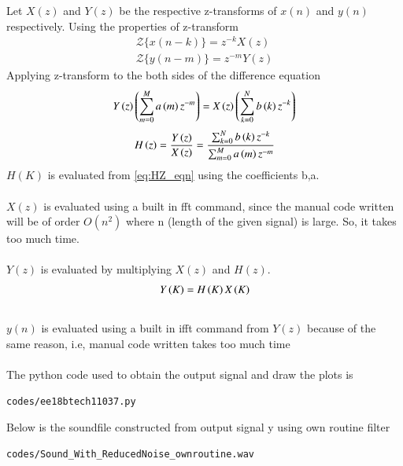 \documentclass[journal,12pt,twocolumn]{IEEEtran}
\begin{document}
  Let $X(z)$ and $Y(z)$ be the respective z-transforms of $x(n)$ and $y(n)$ respectively.
  Using the properties of z-transform
  \begin{align}
      {\mathcal {Z}}\{x(n-k)\} = z^{-k}X(z) \\
      {\mathcal {Z}}\{y(n-m)\} = z^{-m}Y(z)
  \end{align}
\newline
Applying z-transform  to the both sides of the difference equation
\begin{align}
     Y\left(z\right) \left(\sum _{m=0}^{M}a\left(m\right) z^{-m}\right) = X\left(z\right) \left(\sum _{k=0}^{N}b\left(k\right)z^{-k}\right)
\end{align}
\begin{align}
\label{eq:HZ_eqn}
    H\left(z\right) = \frac{Y\left(z\right)}{X\left(z\right)} = \frac{\sum _{k=0}^{N}b\left(k\right) z^{-k}}{\sum _{m=0}^{M}a\left(m\right)z^{-m}}
\end{align}    
$H(K)$ is evaluated from \eqref{eq:HZ_eqn} using the coefficients b,a.
\\
\\
$X(z)$ is evaluated using a built in fft command, since the manual code written will be of order $O(n^{2})$ where n (length of the given signal) is large. So, it takes too much time.
\\
\\
$Y(z)$ is evaluated by multiplying $X(z)$ and $H(z)$.
\begin{align}
    Y\left(K\right) = H\left(K\right)X\left(K\right)
\end{align}
\\
$y(n)$ is evaluated using a built in ifft command from $Y(z)$ because of the same reason, i.e, manual code written takes too much time
\\
\\
The python code used to obtain the output signal and draw the plots is
\begin{lstlisting}
codes/ee18btech11037.py
\end{lstlisting}
Below is the soundfile constructed from output signal y using own routine filter 
\begin{lstlisting}
codes/Sound_With_ReducedNoise_ownroutine.wav
\end{lstlisting}
\end{document}
